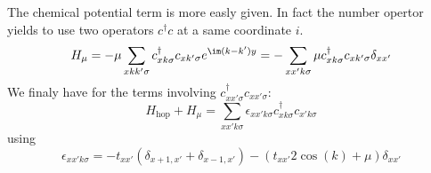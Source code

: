 \documentclass[../main.tex]{subfile}
\begin{document}
The chemical potential term is more easly given. In fact the number opertor yields to use two operators $c^{\dagger}c$ at a same coordinate $i$.
\begin{equation}
    H_{\mu} = -\mu \sum_{x kk' \sigma} c_{x k\sigma}^{\dagger} c_{x k'\sigma} e^{\im (k-k')y} = -   \sum_{xx'k\sigma} \mu c_{xk\sigma}^{\dagger} c_{xk'\sigma} \delta_{xx'}     
\end{equation}
We finaly have for the terms involving $c^{\dagger}_{xx'\sigma} c_{xx'\sigma}$:
\begin{equation*}
    H_{\text{hop}} + H_{\mu} = \sum_{xx'k\sigma} \epsilon_{xx'k\sigma} c_{xk\sigma}^{\dagger} c_{x'k\sigma}
\end{equation*}
using
\[
    \epsilon_{xx'k\sigma}= - t_{xx'} \left(\delta_{x+1, x'} + \delta_{x-1,x'}\right) - \left(t_{xx'}2\cos(k) + \mu\right) \delta_{xx'}
\]
\end{document}
